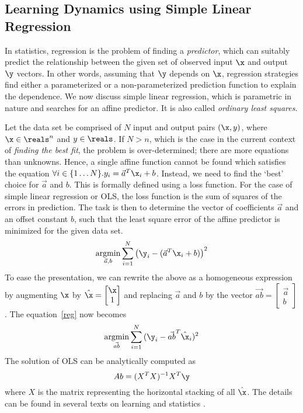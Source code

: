\subsection{Learning Dynamics using Simple Linear Regression}


In statistics, regression is the problem of finding a
\textit{predictor}, which can suitably predict the relationship
between the given set of observed input $\x$ and output $\y$ vectors.
In other words, assuming that $\y$ depends on $\x$, regression
strategies find either a parameterized or a non-parameterized
prediction function to explain the dependence. We now discuss simple
linear regression, which is parametric in nature and searches for an
affine predictor. It is also called \textit{ordinary least squares}.


Let the data set be comprised of $N$ input and output pairs $(\x,
y)$, where $\x\in\reals^n$ and $y\in\reals$. If $N>n$, which is
the case in the current context of \textit{finding the best fit}, the
problem is over-determined; there are more equations than
unknowns. Hence, a single affine function cannot be found which
satisfies the equation $\forall i\in\{1\ldots N\}. y_i = \vec{a}^T\x_i + b$. Instead, we
need to find the `best' choice for $\vec{a}$ and $b$. This is formally
defined using a loss function. For the case of simple linear
regression or OLS, the loss function is the sum of squares of the
errors in prediction.  The task is then to determine the vector of
coefficients $\vec{a}$ and an offset constant $b$, such that the least
square error of the affine predictor is minimized for the given data
set.
\begin{equation}
    \operatornamewithlimits{argmin}_{\vec{a}, b}\displaystyle\sum_{i=1}^{N}{\left(\y_i - (\vec{a}^T\x_i + b)\right)^2}
\label{reg}
\end{equation}
To ease the presentation, we can rewrite the above as a homogeneous
expression by augmenting $\x$ by $\hat{\x} = \begin{bmatrix}\x \\ 1\end{bmatrix}$ and replacing $\vec{a}$ and $b$ by the vector
$\vec{ab} = \begin{bmatrix}\vec{a} \\ b \end{bmatrix}$. The equation~\ref{reg} now becomes
\[
    \operatornamewithlimits{argmin}_{\vec{ab}}\displaystyle\sum_{i=1}^{N}{(\y_i - \vec{ab}^T \hat{\x}_i)^2}
\]
The solution of OLS can be analytically computed as
\[ Ab = (X^TX)^{-1}X^T\y\]
where $X$ is the matrix representing the horizontal stacking of all
$\hat{\x}$.
The details can be found in several texts on learning and statistics
\cite{friedman2001elements}.

